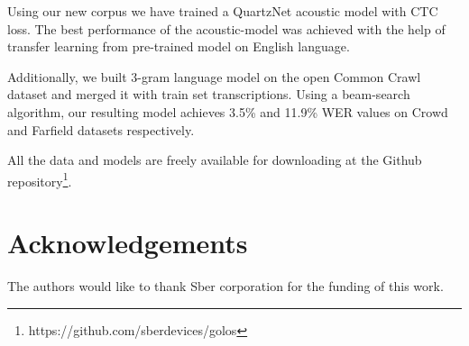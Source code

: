 \documentclass[a4paper]{article}
\begin{document}
Using our new corpus we have trained a QuartzNet acoustic model with CTC loss. The best performance of the acoustic-model was achieved with the help of transfer learning from pre-trained model on English language. 

Additionally, we built 3-gram language model on the open Common Crawl dataset and merged it with train set transcriptions. Using a beam-search algorithm, our resulting model achieves 3.5\% and 11.9\% WER values on Crowd and Farfield datasets respectively.

All the data and models are freely available for downloading at the Github repository\footnote{https://github.com/sberdevices/golos}.


\section{Acknowledgements}

The authors would like to thank Sber corporation for the funding of this work.





\end{document}
